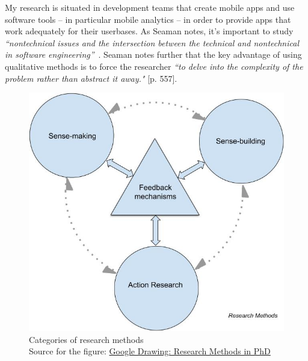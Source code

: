 My research is situated in development teams that create mobile apps and use software tools -- in particular mobile analytics -- in order to provide apps that work adequately for their userbases. As Seaman notes, it's important to study \emph{``nontechnical issues and the intersection between the technical and nontechnical in software engineering''}~. Seaman notes further that the key advantage of using qualitative methods is to force the researcher \emph{``to delve into the complexity of the problem rather than abstract it away."} [p. 557].

\begin{figure}
    \centering
    \includegraphics{images/my/categories-of-research-methods-02-aug-2022.jpeg}
    \caption[Categories of research methods]{Categories of research methods \\Source for the figure: {\footnotesize \href{https://docs.google.com/drawings/d/1DpnrvH1ajAKtmcpbJjTWEshdQG_nAIfDS_eAL8obSAQ/edit?usp=sharing}{Google Drawing: Research Methods in PhD}}}
    \label{fig:categories-of-research-methods}
\end{figure}


